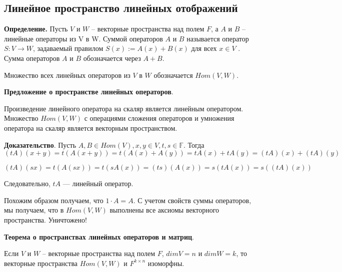 \documentclass[a4paper]{article}
\begin{document}
    \subsection*{Линейное пространство линейных отображений}
    \textbf{Определение.} Пусть $V$ и $W$ – векторные пространства над полем $F$, а $A$ и $B$ – линейные операторы из V в W. Суммой операторов $A$ и $B$ называется оператор $S : V \rightarrow W$, задаваемый правилом $S(x) := A(x) + B(x)$ для всех $x \in V$ .
    Сумма операторов $A$ и $B$ обозначается через $A + B$.

    Множество всех линейных операторов из $V$ в $W$ обозначается $Hom(V, W)$.

    \begin{htheorem}
        \textbf{Предложение о пространстве линейных операторов}.

        Произведение линейного оператора на скаляр является линейным
        оператором. Множество $Hom(V, W)$ с операциями сложения операторов
        и умножения оператора на скаляр является векторным пространством.
    \end{htheorem}


    \begin{hproof}
        \textbf{Доказательство}. Пусть $A,B \in Hom(V), x,y \in V, t, s \in \mathbb{F}$. Тогда
        \begin{equation}
        (tA)(x+y)
            = t(A(x+y)) = t(A(x) + A(y)) = tA(x) + tA(y) = (tA)(x) + (tA)(y)
        \end{equation}

        \begin{equation}
        (tA)(sx)
            = t(A(sx)) = t(sA(x)) = (ts)(A(x)) = s(tA(x)) = s((tA)(x))
        \end{equation}

        Следовательно, $tA$ --- линейный оператор.

        Похожим образом получаем, что $1 \cdot A = A$. С учетом свойств суммы операторов, мы получаем, что в $Hom(V, W)$ выполнены все аксиомы векторного пространства. Уничтожено!
    \end{hproof}

    \begin{htheorem}
        \textbf{Теорема о пространствах линейных операторов и матриц}.

        Если $V$ и $W$ – векторные пространства над полем $F$, $dim V = n$ и
        $dim W = k$, то векторные пространства $Hom(V,W)$ и $F^{k\times n}$ изоморфны.
    \end{htheorem}
\end{document}
